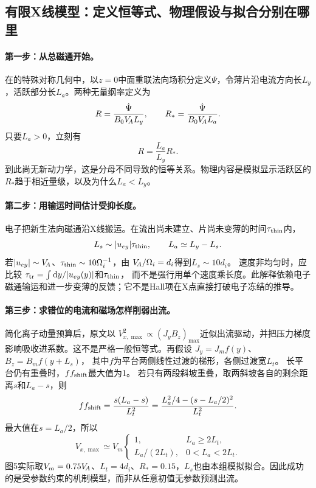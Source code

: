 \documentclass[UTF8,a4paper,11pt,openany,fontset=fandol]{ctexbook}
\begin{document}
\subsection{有限X线模型：定义恒等式、物理假设与拟合分别在哪里}\label{sec:synthesis-length-model}
\paragraph{第一步：从总磁通开始。}
在\citet{F792}的特殊对称几何中，以$z=0$中面重联法向场积分定义$\Psi$，令薄片沿电流方向长$L_y$，活跃部分长$L_a$。两种无量纲率定义为
\begin{equation}
R=\frac{\dot\Psi}{B_0V_{\!A} L_y},\qquad
R_*=\frac{\dot\Psi}{B_0V_{\!A} L_a}.
\end{equation}
只要$L_a>0$，立刻有
\begin{equation}
R=\frac{L_a}{L_y}R_* .
\label{eq:synthesis-active}
\end{equation}
到此尚无新动力学，这是分母不同导致的恒等关系。物理内容是模拟显示活跃区的$R_*$趋于相近量级，以及为什么$L_a<L_y$。

\paragraph{第二步：用输运时间估计受抑长度。}
电子把新生法向磁通沿X线搬运。在流出尚未建立、片尚未变薄的时间$\tau_{\rm thin}$内，
\begin{equation}
L_s\sim |u_{ey}|\tau_{\rm thin},\qquad L_a\simeq L_y-L_s.
\end{equation}
若$|u_{ey}|\sim V_{\!A}$、$\tau_{\rm thin}\sim10\Omega_i^{-1}$，由
$V_{\!A}/\Omega_i=d_i$得到$L_s\sim10d_i$。
速度非均匀时，应比较
$\tau_{\rm tr}=\int\mathrm d y/|u_{ey}(y)|$和$\tau_{\rm thin}$，
而不是强行用单个速度乘长度。此解释依赖电子磁通输运和进一步变薄的反馈；它不是Hall项在X点直接打破电子冻结的推导。\citep{F659}

\paragraph{第三步：求错位的电流和磁场怎样削弱出流。}
简化离子动量预算后，原文以
$V_{x,\max}^2\propto(J_yB_z)_{\max}$近似出流驱动，并把压力梯度影响吸收进系数。这不是严格一般恒等式。再假设
$J_y=J_m f(y)$、$B_z=B_m f(y+L_s)$，
其中$f$为平台两侧线性过渡的梯形，各侧过渡宽$L_t$。
长平台仍有重叠时，$f f_{\rm shift}$最大值为1。
若只有两段斜坡重叠，取两斜坡各自的剩余距离$s$和$L_a-s$，则
\begin{equation}
f f_{\rm shift}=\frac{s(L_a-s)}{L_t^2}
=\frac{L_a^2/4-(s-L_a/2)^2}{L_t^2}.
\end{equation}
最大值在$s=L_a/2$，所以
\begin{equation}
V_{x,\max}\simeq V_m
\begin{cases}
1,& L_a\geq2L_t,\\
L_a/(2L_t),&0<L_a<2L_t.
\end{cases}
\end{equation}
图5实际取$V_m=0.75V_{\!A}$、$L_t=4d_i$、$R_*=0.15$，$L_s$也由本组模拟拟合。因此成功的是受参数约束的机制模型，而非从任意初值无参数预测出流。
\end{document}
